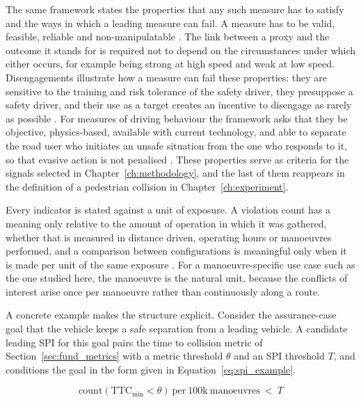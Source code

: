 The same framework states the properties that any such measure has to satisfy and the
ways in which a leading measure can fail. A measure has to be valid, feasible,
reliable and non-manipulatable \cite{fraadeblanar2018}. The link between a proxy and
the outcome it stands for is required not to depend on the circumstances under
which either occurs, for example being strong at high speed and weak at low speed. Disengagements
illustrate how a measure can fail these properties: they are sensitive to the training
and risk tolerance of the safety driver, they presuppose a safety driver, and their
use as a target creates an incentive to disengage as rarely as possible
\cite{fraadeblanar2018}. For measures of driving behaviour the framework asks that they
be objective, physics-based, available with current technology, and able to separate
the road user who initiates an unsafe situation from the one who responds to it, so
that evasive action is not penalised \cite{fraadeblanar2018}. These properties serve
as criteria for the signals selected in Chapter~\ref{ch:methodology}, and the last of
them reappears in the definition of a pedestrian collision in
Chapter~\ref{ch:experiment}.

Every indicator is stated against a unit of exposure. A violation count has a meaning
only relative to the amount of operation in which it was gathered, whether that is
measured in distance driven, operating hours or manoeuvres performed, and a comparison
between configurations is meaningful only when it is made per unit of the same
exposure \cite{fraadeblanar2018}. For a manoeuvre-specific use case such as the one
studied here, the manoeuvre is the natural unit, because the conflicts of interest
arise once per manoeuvre rather than continuously along a route.

A concrete example makes the structure explicit. Consider the assurance-case goal that
the vehicle keeps a safe separation from a leading vehicle. A candidate leading \ac{SPI}
for this goal pairs the time to collision metric of Section~\ref{sec:fund_metrics} with
a metric threshold $\theta$ and an SPI threshold $T$, and conditions the goal
in the form given in Equation~\eqref{eq:spi_example}.

\begin{equation}
    \mathrm{count}\!\left(\mathrm{TTC}_{\min} < \theta\right)\ \mathrm{per}\ 100\mathrm{k}\ \mathrm{manoeuvres}\ <\ T
    \label{eq:spi_example}
\end{equation}

